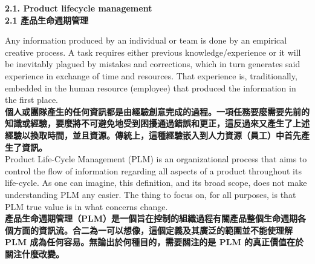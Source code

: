 \documentclass[24pt]{article} %
\begin{document}
\begin{center}
\Large \textbf{2.1. Product lifecycle management }\\

\Large \textbf{2.1 產品生命週期管理}\\
\end{center}
Any information produced by an individual or team is done by an empirical creative process. A task requires either previous knowledge/experience or it will be inevitably plagued by mistakes and corrections, which in turn generates said experience in exchange of time and resources. That experience is, traditionally, embedded in the human resource (employee) that produced the information in the first place.\\

\textbf{個人或團隊產生的任何資訊都是由經驗創意完成的過程。一項任務要麼需要先前的知識或經驗，要麼將不可避免地受到困擾通過錯誤和更正，這反過來又產生了上述經驗以換取時間，並且資源。傳統上，這種經驗嵌入到人力資源（員工）中首先產生了資訊。}\\

Product Life-Cycle Management (PLM) is an organizational process that aims to control the flow of information regarding all aspects of a product throughout its life-cycle. As one can imagine, this definition, and its broad scope, does not make understanding PLM any easier. The thing to focus on, for all purposes, is that PLM true value is in what concerns change.\\

\textbf{產品生命週期管理（PLM）是一個旨在控制的組織過程有關產品整個生命週期各個方面的資訊流。合二為一可以想像，這個定義及其廣泛的範圍並不能使理解 PLM 成為任何容易。無論出於何種目的，需要關注的是 PLM 的真正價值在於關注什麼改變。}\\
\end{document}
